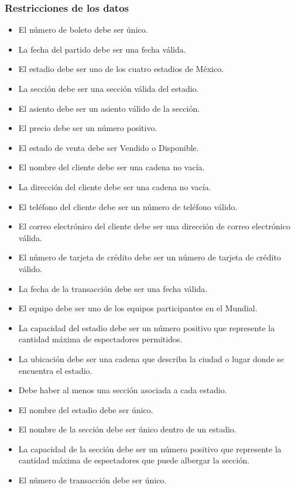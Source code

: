 \subsubsection*{Restricciones de los datos}

\begin{itemize}
    \item El número de boleto debe ser único.
    \item La fecha del partido debe ser una fecha válida.
    \item El estadio debe ser uno de los cuatro estadios de México.
    \item La sección debe ser una sección válida del estadio.
    \item El asiento debe ser un asiento válido de la sección.
    \item El precio debe ser un número positivo.
    \item El estado de venta debe ser Vendido o Disponible.
    \item El nombre del cliente debe ser una cadena no vacía.
    \item La dirección del cliente debe ser una cadena no vacía.
    \item El teléfono del cliente debe ser un número de teléfono válido.
    \item El correo electrónico del cliente debe ser una dirección de correo electrónico válida.
    \item El número de tarjeta de crédito debe ser un número de tarjeta de crédito válido.
    \item La fecha de la transacción debe ser una fecha válida.
    \item El equipo debe ser uno de los equipos participantes en el Mundial.
    \item La capacidad del estadio debe ser un número positivo que represente la cantidad máxima de espectadores permitidos.
    \item La ubicación debe ser una cadena que describa la ciudad o lugar donde se encuentra el estadio.
    \item Debe haber al menos una sección asociada a cada estadio.
    \item El nombre del estadio debe ser único.
    \item El nombre de la sección debe ser único dentro de un estadio.
    \item La capacidad de la sección debe ser un número positivo que represente la cantidad máxima de espectadores que puede albergar la sección.
    \item El número de transacción debe ser único.

\end{itemize}
